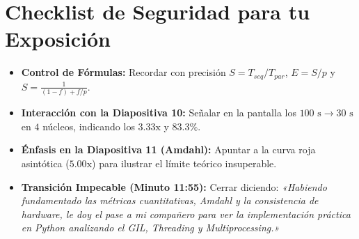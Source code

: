 \documentclass[11pt,a4paper]{article}
\begin{document}
\section{Checklist de Seguridad para tu Exposición}

\begin{itemize}[leftmargin=6mm]
    \item[$\square$] \textbf{Control de Fórmulas:} Recordar con precisión $S = T_{seq}/T_{par}$, $E = S/p$ y $S = \frac{1}{(1-f) + f/p}$.
    \item[$\square$] \textbf{Interacción con la Diapositiva 10:} Señalar en la pantalla los $100\text{ s} \to 30\text{ s}$ en $4$ núcleos, indicando los $3.33\text{x}$ y $83.3\%$.
    \item[$\square$] \textbf{Énfasis en la Diapositiva 11 (Amdahl):} Apuntar a la curva roja asintótica ($5.00\text{x}$) para ilustrar el límite teórico insuperable.
    \item[$\square$] \textbf{Transición Impecable (Minuto 11:55):} Cerrar diciendo: \textit{«Habiendo fundamentado las métricas cuantitativas, Amdahl y la consistencia de hardware, le doy el pase a mi compañero para ver la implementación práctica en Python analizando el GIL, Threading y Multiprocessing.»}
\end{itemize}
\end{document}
